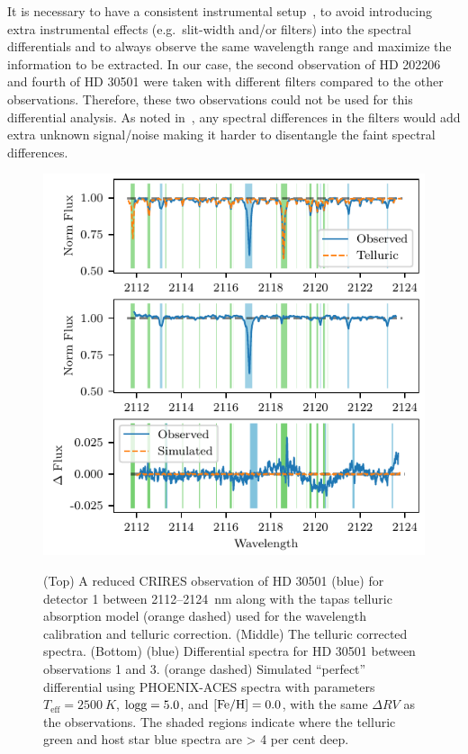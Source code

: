 \documentclass[fleqn,usenatbib]{mnras}
\begin{document}
    It is necessary to have a consistent instrumental setup~\citet{ferluga_separating_1997}, to avoid introducing extra instrumental effects (e.g.\ slit-width and/or filters) into the spectral differentials and to always observe the same wavelength range and maximize the information to be extracted. In our case, the second observation of {HD 202206} and fourth of {HD 30501} were taken with different filters compared to the other observations. Therefore, these two observations could not be used for this differential analysis. As noted in~\citep{hadrava_disentangling_2009}, any spectral differences in the filters would add extra unknown signal/noise making it harder to disentangle the faint spectral differences.


    \begin{figure}
        \includegraphics[width=0.95\hsize]{images/fig11.pdf}\\
        \caption{ (Top) A reduced CRIRES observation of {HD 30501} (blue) for detector 1 between 2112--2124~nm along with the tapas telluric absorption model ({orange} dashed) used for the wavelength calibration and telluric correction. (Middle) The telluric corrected spectra. (Bottom) ({blue}) Differential spectra for {HD 30501} between observations 1 and 3. ({orange} dashed) Simulated ``perfect'' differential using PHOENIX-ACES spectra with parameters \(T_{\textrm{eff}} = 2500~K\), \(\rm logg=5.0\), and \(\rm [Fe/H]=0.0\), with the same \(\Delta RV\) as the observations. The shaded regions indicate where the telluric {green} and host star {blue} spectra are > 4 per cent deep.}
        \label{fig:spectral_example}
    \end{figure}
\end{document}
